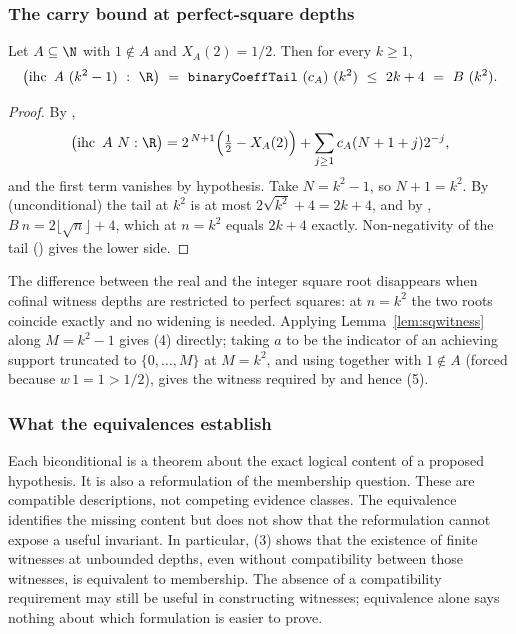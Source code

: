 \subsubsection*{The carry bound at perfect-square depths}

\begin{lem}
\label{lem:sqwitness}
Let $A\subseteq\N$ with $1\notin A$ and $X_{A}(2)=1/2$. Then for every
$k\ge1$,
\[
\bigl(\ensuremath{\operatorname{ihc}}\ A\ (k^{2}-1)\ :\ \R\bigr)
\ =\ \mathtt{binaryCoeffTail}\ (c_{A})\ (k^{2})
\ \le\ 2k+4\ =\ \ensuremath{B}\ (k^{2}).
\]
\end{lem}
\begin{proof}
By ,
\[
\bigl(\ensuremath{\operatorname{ihc}}\ A\ N:\R\bigr)
= 2^{\,N+1}\Bigl(\tfrac12-X_{A}(2)\Bigr)
+\sum_{j\ge1}c_{A}(N+1+j)2^{-j},
\]
and the first term vanishes by hypothesis. Take $N=k^{2}-1$, so $N+1=k^{2}$. By
(unconditional) the tail at $k^2$ is at most $2\sqrt{k^{2}}+4=2k+4$, and by
, $\ensuremath{B}\ n
= 2\lfloor\sqrt n\rfloor+4$, which at $n=k^{2}$ equals $2k+4$ exactly. Non-negativity of the tail
() gives the lower side.
\end{proof}

The difference between the real and the integer square root disappears when cofinal witness
depths are restricted to perfect squares: at $n=k^{2}$ the two roots coincide
exactly and no widening is needed. Applying Lemma~\ref{lem:sqwitness} along $M=k^{2}-1$ gives (4)
directly; taking $a$ to be the indicator of an achieving support truncated to
$\{0,\ldots,M\}$ at $M=k^{2}$, and using
 together with
$1\notin A$ (forced because $\ensuremath{w}\,1=1>1/2$), gives the witness required by
 and hence (5).

\subsubsection*{What the equivalences establish}

Each biconditional is a theorem about the exact logical content of a
proposed hypothesis.  It is also a reformulation of the membership
question.  These are compatible descriptions, not competing evidence
classes. The equivalence identifies the missing content but does
not show that the reformulation cannot expose a useful invariant. In particular, (3) shows that the existence of finite witnesses at
unbounded depths, even without compatibility between those witnesses,
is equivalent to membership.  The absence of a compatibility requirement
may still be useful in constructing witnesses; equivalence alone says
nothing about which formulation is easier to prove.

